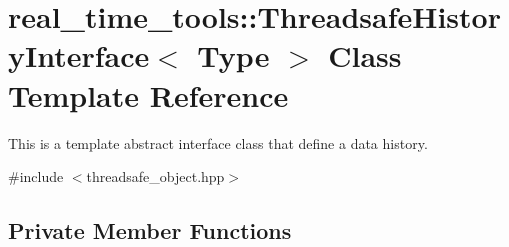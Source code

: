 \hypertarget{classreal__time__tools_1_1ThreadsafeHistoryInterface}{}\section{real\+\_\+time\+\_\+tools\+:\+:Threadsafe\+History\+Interface$<$ Type $>$ Class Template Reference}
\label{classreal__time__tools_1_1ThreadsafeHistoryInterface}


This is a template abstract interface class that define a data history.  




{\ttfamily \#include $<$threadsafe\+\_\+object.\+hpp$>$}

\subsection*{Private Member Functions}
